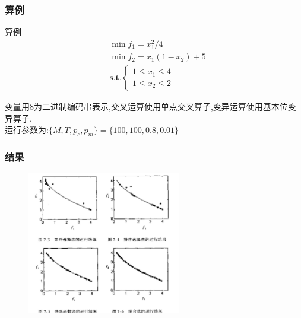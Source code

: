 \documentclass{beamer}
\begin{document}
\begin{frame}
	\frametitle{算例}
	\begin{block}{算例}
		\begin{eqnarray*}
			&\min f_1=x_1^2/4\\
			&\min f_2=x_1(1-x_2)+5\\
			&\textbf{s.t.} \left\{ \begin{array}{c}
				1\le x_1 \le 4\\
				1\le x_2 \le 2	
			\end{array} \right.
		\end{eqnarray*}
	\end{block}
	\begin{block}{}
		变量用8为二进制编码串表示,交叉运算使用单点交叉算子,变异运算使用基本位变异算子.\\
		运行参数为:$ \{ M,T,p_c,p_m \} = \{ 100,100,0.8,0.01 \}$
		
	\end{block}

	

\end{frame}
\begin{frame}
	\frametitle{结果}
\begin{figure}[htbp]
	\centering
	\includegraphics[width=0.6\textwidth]{计算结果.jpg}
\end{figure}
\end{frame}
\end{document}
